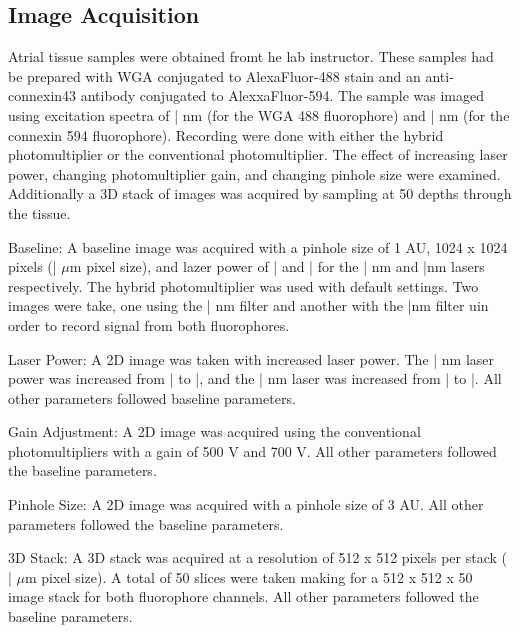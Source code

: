 \documentclass[12pt]{article}
\newcommand{\micro}{{$\mu$}}
\begin{document}
\subsection{Image Acquisition}
Atrial tissue samples were obtained fromt he lab instructor. These samples had be prepared with WGA conjugated to AlexaFluor-488 stain and an anti-connexin43 antibody conjugated to AlexxaFluor-594. The sample was imaged using excitation spectra of | nm (for the WGA 488 fluorophore) and | nm (for the connexin 594 fluorophore). Recording were done with either the hybrid photomultiplier or the conventional photomultiplier. The effect of increasing laser power, changing photomultiplier gain, and changing pinhole size were examined. Additionally a 3D stack of images was acquired by sampling at 50 depths through the tissue.
\par{Baseline:} A baseline image was acquired with a pinhole size of 1 AU, 1024 x 1024 pixels (| \micro m pixel size), and lazer power of | and | for the | nm and |nm lasers respectively. The hybrid photomultiplier was used with default settings. Two images were take, one using the | nm filter and another with the |nm filter uin order to record signal from both fluorophores.
\par{Laser Power:} A 2D image was taken with increased laser power. The | nm laser power was increased from | to |, and the | nm laser was increased from | to |. All other parameters followed baseline parameters.
\par{Gain Adjustment:} A 2D image was acquired using the conventional photomultipliers with a gain of 500 V and 700 V. All other parameters followed the baseline parameters.
\par{Pinhole Size:} A 2D image was acquired with a pinhole size of 3 AU. All other parameters followed the baseline parameters.
\par{3D Stack: } A 3D stack was acquired at a resolution of 512 x 512 pixels per stack ( | \micro m pixel size). A total of 50 slices were taken making for a 512 x 512 x 50 image stack for both fluorophore channels. All other parameters followed the baseline parameters.
\end{document}
